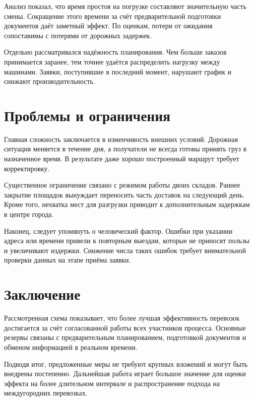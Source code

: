 Анализ показал, что время простоя на погрузке составляют значительную часть
смены. Сокращение этого времени за счёт предварительной подготовки документов
даёт заметный эффект. По оценкам, потери от ожидания сопоставимы с потерями от
дорожных задержек.

Отдельно рассматривался надёжность планирования. Чем больше заказов принимается
заранее, тем точнее удаётся распределить нагрузку между машинами. Заявки,
поступившие в последний момент, нарушают график и снижают производительность.

\chapter{Проблемы и ограничения}

Главная сложность заключается в изменчивость внешних условий. Дорожная ситуация
меняется в течение дня, а получатели не всегда готовы принять груз в назначенное
время. В результате даже хорошо построенный маршрут требует корректировку.

Существенное ограничение связано с режимом работы двоих складов. Раннее закрытие
площадок вынуждает переносить часть доставок на следующий день. Кроме того,
нехватка мест для разгрузки приводит к дополнительным задержкам в центре города.

Наконец, следует упомянуть о человеческий фактор. Ошибки при указании адреса или
времени привели к повторным выездам, которые не приносят пользы и увеличивают
издержки. Снижение числа таких ошибок требует внимательной проверки данных на
этапе приёма заявки.

\chapter{Заключение}

Рассмотренная схема показывает, что более лучшая эффективность перевозок достигается
за счёт согласованной работы всех участников процесса. Основные резервы связаны с
предварительным планированием, подготовкой документов и обменом информацией в
реальном времени.

Подводя итог, предложенные меры не требуют крупных вложений и могут быть внедрены постепенно.
Дальнейшая работа играет большое значение для оценки эффекта на более длительном интервале и
распространение подхода на междугородних перевозках.
